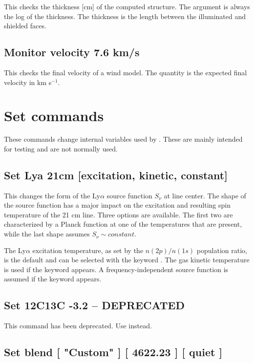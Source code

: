 This checks the thickness [cm] of the computed structure.
The argument
is always the log of the thickness.
The thickness is the length between
the illuminated and shielded faces.

\subsection{Monitor velocity 7.6 km/s}

This checks the final velocity of a wind model.
The quantity is the
expected final velocity in km s$^{-1}$.

\section{Set commands}

These commands change internal variables used by \Cloudy.
These are mainly
intended for testing and are not normally used.

\subsection{Set Lya 21cm [excitation, kinetic, constant]}
This changes the form of the Ly$\alpha$ source function $S_{\nu}$ at line center.
The shape of the source function has a major impact on the excitation
and resulting spin temperature of the 21 cm line.
Three options are available.  The first two are characterized by a Planck function
at one of the temperatures that are present, while the last shape assumes $S_{\nu} \sim constant$.

The Ly$\alpha$ excitation temperature, as set by the $n(2p)/n(1s)$ population ratio, is the default
and can be selected with the keyword .
The gas kinetic temperature is used if the keyword  appears.
A frequency-independent source function is assumed if the keyword  appears.

\subsection{Set 12C13C -3.2 -- DEPRECATED}

This command has been deprecated.
Use  instead.

\subsection{Set blend [ "Custom" ] [ 4622.23 ] [ quiet ]}

